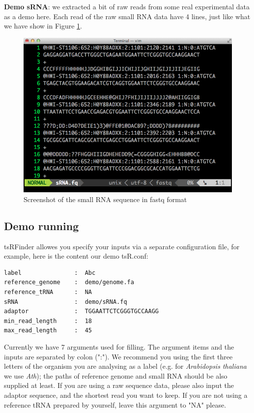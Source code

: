 \documentclass[11pt, a4paper]{article}
\begin{document}
\textbf{Demo sRNA}: we extracted a bit of raw reads from some real experimental data as a demo here. Each read of the raw small RNA data have 4 lines, just like what we have show in Figure \ref{fastq}.

\begin{figure}[htbp]
\begin{center}
\includegraphics[width=12cm]{fastq.png}
\caption{Screenshot of the small RNA sequence in fastq format} 
\label{fastq}
\end{center}
\end{figure}

\subsection{Demo running}

tsRFinder allowes you specify your inputs via a separate configuration file, for example, here is the content our demo tsR.conf:

\begin{verbatim}
label               :  Abc
reference_genome    :  demo/genome.fa 
reference_tRNA      :  NA
sRNA                :  demo/sRNA.fq
adaptor             :  TGGAATTCTCGGGTGCCAAGG
min_read_length     :  18
max_read_length     :  45
\end{verbatim}

Currently we have 7 arguments used for filling. The argument items and the inputs are separated by colon (":"). We recommend you using the first three letters of the organism you are analysing as a label (e.g. for \textit{Arabidopsis thaliana} we use \textit{Ath}); the paths of reference genome and small RNA should be also supplied at least. If you are using a raw sequence data, please also input the adaptor sequence, and the shortest read you want to keep. If you are not using a reference tRNA prepared by yourself, leave this argument to "NA" please.
\end{document}
